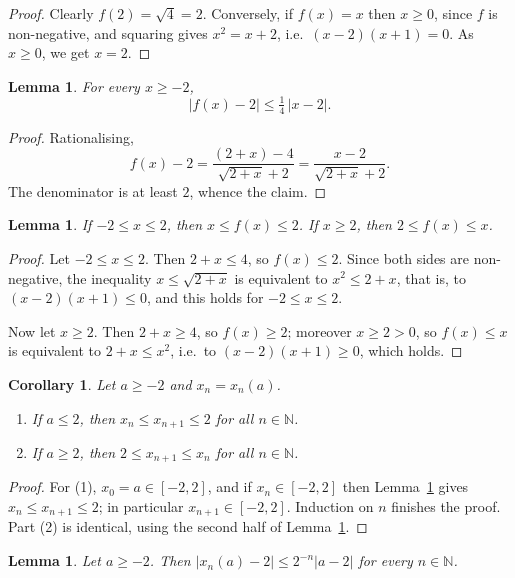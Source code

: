 \documentclass[11pt]{amsart}
\newtheorem{lemma}[theorem]{Lemma}
\newtheorem{corollary}[theorem]{Corollary}
\theoremstyle{definition}
\begin{document}
\begin{proof}
Clearly $f(2)=\sqrt4=2$. Conversely, if $f(x)=x$ then $x\ge 0$, since $f$ is
non-negative, and squaring gives $x^2=x+2$, i.e.\ $(x-2)(x+1)=0$. As $x\ge 0$,
we get $x=2$.
\end{proof}

\begin{lemma}\label{lem:contr}
For every $x\ge -2$,
\[
  |f(x)-2|\le \tfrac14\,|x-2|.
\]
\end{lemma}

\begin{proof}
Rationalising,
\[
  f(x)-2=\frac{(2+x)-4}{\sqrt{2+x}+2}=\frac{x-2}{\sqrt{2+x}+2}.
\]
The denominator is at least $2$, whence the claim.
\end{proof}

\begin{lemma}\label{lem:mono}
If $-2\le x\le 2$, then $x\le f(x)\le 2$. If $x\ge 2$, then $2\le f(x)\le x$.
\end{lemma}

\begin{proof}
Let $-2\le x\le 2$. Then $2+x\le 4$, so $f(x)\le 2$. Since both sides are
non-negative, the inequality $x\le\sqrt{2+x}$ is equivalent to $x^2\le 2+x$,
that is, to $(x-2)(x+1)\le 0$, and this holds for $-2\le x\le 2$.

Now let $x\ge 2$. Then $2+x\ge 4$, so $f(x)\ge 2$; moreover $x\ge 2>0$, so
$f(x)\le x$ is equivalent to $2+x\le x^2$, i.e.\ to $(x-2)(x+1)\ge 0$, which
holds.
\end{proof}

\begin{corollary}\label{cor:monoseq}
Let $a\ge -2$ and $x_n=x_n(a)$.
\begin{enumerate}
\item If $a\le 2$, then $x_n\le x_{n+1}\le 2$ for all $n\in\mathbb N$.
\item If $a\ge 2$, then $2\le x_{n+1}\le x_n$ for all $n\in\mathbb N$.
\end{enumerate}
\end{corollary}

\begin{proof}
For (1), $x_0=a\in[-2,2]$, and if $x_n\in[-2,2]$ then Lemma~\ref{lem:mono}
gives $x_n\le x_{n+1}\le 2$; in particular $x_{n+1}\in[-2,2]$. Induction on
$n$ finishes the proof. Part (2) is identical, using the second half of
Lemma~\ref{lem:mono}.
\end{proof}

\begin{lemma}\label{lem:rate}
Let $a\ge -2$. Then $|x_n(a)-2|\le 2^{-n}|a-2|$ for every $n\in\mathbb N$.
\end{lemma}
\end{document}
